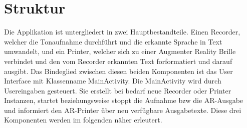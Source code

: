 \chapter{Struktur}
Die Applikation ist untergliedert in zwei Hauptbestandteile. Einen Recorder, welcher die Tonaufnahme durchführt und die erkannte Sprache in Text umwandelt, und ein Printer, welcher sich zu einer Augmenter Reality Brille verbindet und den vom Recorder erkannten Text forformatiert und darauf ausgibt. Das Bindeglied zwischen diesen beiden Komponenten ist das User Interface mit Klassenname MainActivity. Die MainActivity wird durch Usereingaben gesteuert. Sie erstellt bei bedarf neue Recorder oder Printer Instanzen, startet beziehungsweise stoppt die Aufnahme bzw die AR-Ausgabe und informiert den AR-Printer über neu verfügbare Ausgabetexte. Diese drei Komponenten werden im folgenden näher erleutert.

